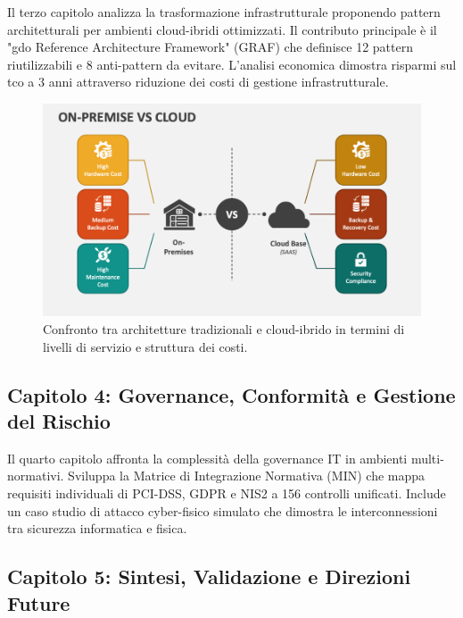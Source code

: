 Il terzo capitolo analizza la trasformazione infrastrutturale proponendo pattern architetturali per ambienti cloud-ibridi ottimizzati. Il contributo principale è il "\gls{gdo} Reference Architecture Framework" (GRAF) che definisce 12 pattern riutilizzabili e 8 anti-pattern da evitare. L'analisi economica dimostra risparmi sul \gls{tco} a 3 anni attraverso riduzione dei costi di gestione infrastrutturale.

\begin{figure}[H]
\centering
\includegraphics[width=\textwidth]{thesis_figures/cap1/on-premise-vs-cloud.png}
\caption{Confronto tra architetture tradizionali e cloud-ibrido in termini di livelli di servizio e struttura dei costi.}
\label{fig:on-premise-vs-cloud}
\end{figure}

\subsection{\texorpdfstring{Capitolo 4: Governance, Conformità e Gestione del Rischio}{1.6.3 - Capitolo 4: Governance, Conformità e Gestione del Rischio}}
\label{subsec:struttura_cap4}

Il quarto capitolo affronta la complessità della governance IT in ambienti multi-normativi. Sviluppa la Matrice di Integrazione Normativa (MIN) che mappa requisiti individuali di PCI-DSS, GDPR e NIS2 a 156 controlli unificati. Include un caso studio di attacco cyber-fisico simulato che dimostra le interconnessioni tra sicurezza informatica e fisica.

\subsection{\texorpdfstring{Capitolo 5: Sintesi, Validazione e Direzioni Future}{1.6.4 - Capitolo 5: Sintesi, Validazione e Direzioni Future}}
\label{subsec:struttura_cap5}

